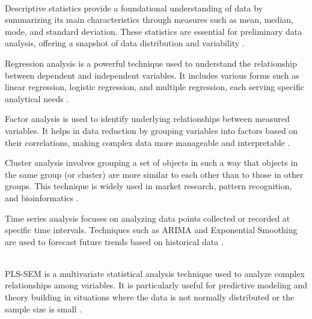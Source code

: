 \hfill \\


\begin{description}[font=\normalfont\itshape]
    \item[\textit{\textbf{Descriptive Statistics}}] Descriptive statistics provide a foundational understanding of data by summarizing its main characteristics through measures such as mean, median, mode, and standard deviation. These statistics are essential for preliminary data analysis, offering a snapshot of data distribution and variability \parencite{Mann2018IntroductoryStatistics}.

    \item[\textit{\textbf{Regression Analysis}}] Regression analysis is a powerful technique used to understand the relationship between dependent and independent variables. It includes various forms such as linear regression, logistic regression, and multiple regression, each serving specific analytical needs \parencite{Montgomery2021IntroductionAnalysis}.

    \item[\textit{\textbf{Factor Analysis}}] Factor analysis is used to identify underlying relationships between measured variables. It helps in data reduction by grouping variables into factors based on their correlations, making complex data more manageable and interpretable \parencite{Andy2018DiscoveringStatistics}.

    \item[\textit{\textbf{Cluster Analysis}}] Cluster analysis involves grouping a set of objects in such a way that objects in the same group (or cluster) are more similar to each other than to those in other groups. This technique is widely used in market research, pattern recognition, and bioinformatics \parencite{Hair2019WhenPLS-SEM}.

    \item[\textit{\textbf{Time Series Analysis}}] Time series analysis focuses on analyzing data points collected or recorded at specific time intervals. Techniques such as ARIMA and Exponential Smoothing are used to forecast future trends based on historical data \parencite{Box2015TimeControl}.

    \item[\textit{\textbf{Partial Least Squares Structural Equation Modeling (PLS-SEM)}}] \hfill \\
    PLS-SEM is a multivariate statistical analysis technique used to analyze complex relationships among variables. It is particularly useful for predictive modeling and theory building in situations where the data is not normally distributed or the sample size is small \parencite{Sarstedt2017PartialModeling}.
\end{description}



